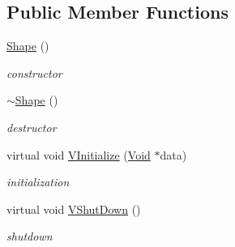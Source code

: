 \subsection*{Public Member Functions}
\begin{DoxyCompactItemize}
\item 
\hypertarget{classContent_1_1Shape_1_1Physics_1_1Shape_a80a33277d4d2207f3a89be2fe6d63d1c}{
\hyperlink{classContent_1_1Shape_1_1Physics_1_1Shape_a80a33277d4d2207f3a89be2fe6d63d1c}{Shape} ()}
\label{classContent_1_1Shape_1_1Physics_1_1Shape_a80a33277d4d2207f3a89be2fe6d63d1c}

\begin{DoxyCompactList}\small\item\em constructor \item\end{DoxyCompactList}\item 
\hypertarget{classContent_1_1Shape_1_1Physics_1_1Shape_a3f3291288a0b969dfe45264709b48c85}{
\hyperlink{classContent_1_1Shape_1_1Physics_1_1Shape_a3f3291288a0b969dfe45264709b48c85}{$\sim$Shape} ()}
\label{classContent_1_1Shape_1_1Physics_1_1Shape_a3f3291288a0b969dfe45264709b48c85}

\begin{DoxyCompactList}\small\item\em destructor \item\end{DoxyCompactList}\item 
\hypertarget{classContent_1_1Shape_1_1Physics_1_1Shape_a866bb6a440dce083096e3d06d62ad43b}{
virtual void \hyperlink{classContent_1_1Shape_1_1Physics_1_1Shape_a866bb6a440dce083096e3d06d62ad43b}{VInitialize} (\hyperlink{structVoid}{Void} $\ast$data)}
\label{classContent_1_1Shape_1_1Physics_1_1Shape_a866bb6a440dce083096e3d06d62ad43b}

\begin{DoxyCompactList}\small\item\em initialization \item\end{DoxyCompactList}\item 
\hypertarget{classContent_1_1Shape_1_1Physics_1_1Shape_a511a3b88fe2af947239fae2a0e9b9277}{
virtual void \hyperlink{classContent_1_1Shape_1_1Physics_1_1Shape_a511a3b88fe2af947239fae2a0e9b9277}{VShutDown} ()}
\label{classContent_1_1Shape_1_1Physics_1_1Shape_a511a3b88fe2af947239fae2a0e9b9277}

\begin{DoxyCompactList}\small\item\em shutdown \item\end{DoxyCompactList}\end{DoxyCompactItemize}
